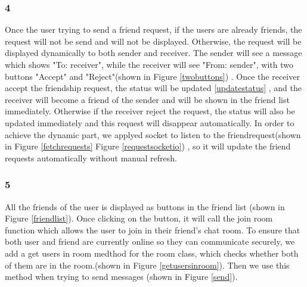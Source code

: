 \documentclass[12pt]{article}
\begin{document}
	   \subsubsection*{4} Once the user trying to send a friend request, if the users are already friends, the request will not be send and will not be displayed. Otherwise, the request will be displayed dynamically to both sender and receiver. The sender will see a message which shows "To: receiver", while the receiver will see "From: sender", with two buttons "Accept" and "Reject"(shown in Figure \ref{twobuttons}) . Once the receiver accept the friendship request, the status will be updated \ref{updatestatus} , and the receiver will become a friend of the sender and will be shown in the friend list immediately. Otherwise if the receiver reject the request, the status will also be updated immediately and this request will disappear automatically.  In order to achieve the dynamic part, we applyed socket to listen to the friendrequest(shown in Figure  \ref{fetchrequests} Figure \ref{requestsocketio}) , so it will update the friend requests automatically without manual refresh.
        \newpage

        \subsubsection*{5} 

        All the friends of the user is displayed as buttons in the friend list (shown in Figure \ref{friendlist}).  Once clicking on the button, it will call the join room function which allows the user to join in their friend's chat room.  To ensure that both user and friend are currently online so they can communicate securely, we add a get users in room medthod for the room class, which checks whether both of them are in the room.(shown in Figure \ref{getusersinroom}). Then we use this method when trying to send messages (shown in Figure \ref{send}).   
\end{document}
